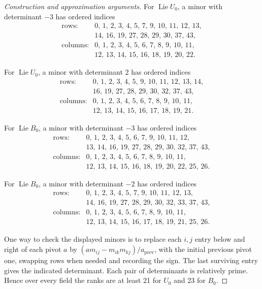 \documentclass[11pt,a4paper,openany,oneside]{book}
\theoremstyle{resultstyle}
\theoremstyle{definition}
\numberwithin{equation}{chapter}
\begin{document}
\begin{proof}[Construction and approximation arguments]
For \(\operatorname{Lie}U_0\), a minor with determinant \(-3\) has ordered indices
\[
\begin{array}{rl}
\text{rows:}&0,\,1,\,2,\,3,\,4,\,5,\,7,\,9,\,10,\,11,\,12,\,13,\\
&14,\,16,\,19,\,27,\,28,\,29,\,30,\,37,\,43,\\
\text{columns:}&0,\,1,\,2,\,3,\,4,\,5,\,6,\,7,\,8,\,9,\,10,\,11,\\
&12,\,13,\,14,\,15,\,16,\,18,\,19,\,20,\,22.
\end{array}
\]

For \(\operatorname{Lie}U_0\), a minor with determinant \(2\) has ordered indices
\[
\begin{array}{rl}
\text{rows:}&0,\,1,\,2,\,3,\,4,\,5,\,9,\,10,\,11,\,12,\,13,\,14,\\
&16,\,19,\,27,\,28,\,29,\,30,\,32,\,37,\,43,\\
\text{columns:}&0,\,1,\,2,\,3,\,4,\,5,\,6,\,7,\,8,\,9,\,10,\,11,\\
&12,\,13,\,14,\,15,\,16,\,17,\,18,\,19,\,21.
\end{array}
\]

For \(\operatorname{Lie}B_0\), a minor with determinant \(-3\) has ordered indices
\[
\begin{array}{rl}
\text{rows:}&0,\,1,\,2,\,3,\,4,\,5,\,6,\,7,\,9,\,10,\,11,\,12,\\
&13,\,14,\,16,\,19,\,27,\,28,\,29,\,30,\,32,\,37,\,43,\\
\text{columns:}&0,\,1,\,2,\,3,\,4,\,5,\,6,\,7,\,8,\,9,\,10,\,11,\\
&12,\,13,\,14,\,15,\,16,\,18,\,19,\,20,\,22,\,25,\,26.
\end{array}
\]

For \(\operatorname{Lie}B_0\), a minor with determinant \(-2\) has ordered indices
\[
\begin{array}{rl}
\text{rows:}&0,\,1,\,2,\,3,\,4,\,5,\,7,\,9,\,10,\,11,\,12,\,13,\\
&14,\,16,\,19,\,27,\,28,\,29,\,30,\,32,\,33,\,37,\,43,\\
\text{columns:}&0,\,1,\,2,\,3,\,4,\,5,\,6,\,7,\,8,\,9,\,10,\,11,\\
&12,\,13,\,14,\,15,\,16,\,17,\,18,\,19,\,21,\,25,\,26.
\end{array}
\]

One way to check the displayed minors is to replace each \(i,j\)
entry below and right of each pivot \(a\) by
\((a m_{ij}-m_{i k}m_{k j})/a_{\mathrm{prev}}\), with the initial
previous pivot one, swapping rows when needed and recording the
sign. The last surviving entry gives the indicated determinant.
Each pair of determinants is relatively prime. Hence over every
field the ranks are at least 21 for \(U_0\) and 23 for \(B_0\).


\end{proof}
\end{document}
